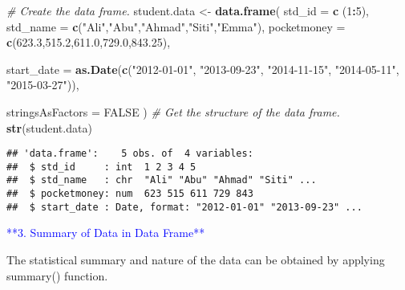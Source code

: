 \documentclass[
]{article}
\newenvironment{Shaded}{\begin{snugshade}}{\end{snugshade}}
\newcommand{\AttributeTok}[1]{\textcolor[rgb]{0.13,0.29,0.53}{#1}}
\newcommand{\CommentTok}[1]{\textcolor[rgb]{0.56,0.35,0.01}{\textit{#1}}}
\newcommand{\ConstantTok}[1]{\textcolor[rgb]{0.56,0.35,0.01}{#1}}
\newcommand{\DecValTok}[1]{\textcolor[rgb]{0.00,0.00,0.81}{#1}}
\newcommand{\FloatTok}[1]{\textcolor[rgb]{0.00,0.00,0.81}{#1}}
\newcommand{\FunctionTok}[1]{\textcolor[rgb]{0.13,0.29,0.53}{\textbf{#1}}}
\newcommand{\NormalTok}[1]{#1}
\newcommand{\OtherTok}[1]{\textcolor[rgb]{0.56,0.35,0.01}{#1}}
\newcommand{\SpecialCharTok}[1]{\textcolor[rgb]{0.81,0.36,0.00}{\textbf{#1}}}
\newcommand{\StringTok}[1]{\textcolor[rgb]{0.31,0.60,0.02}{#1}}
\begin{document}
\begin{Shaded}
\begin{Highlighting}[]
\CommentTok{\# Create the data frame.}
\NormalTok{student.data }\OtherTok{\textless{}{-}} \FunctionTok{data.frame}\NormalTok{(}
   \AttributeTok{std\_id =} \FunctionTok{c}\NormalTok{ (}\DecValTok{1}\SpecialCharTok{:}\DecValTok{5}\NormalTok{), }
   \AttributeTok{std\_name =} \FunctionTok{c}\NormalTok{(}\StringTok{"Ali"}\NormalTok{,}\StringTok{"Abu"}\NormalTok{,}\StringTok{"Ahmad"}\NormalTok{,}\StringTok{"Siti"}\NormalTok{,}\StringTok{"Emma"}\NormalTok{),}
   \AttributeTok{pocketmoney =} \FunctionTok{c}\NormalTok{(}\FloatTok{623.3}\NormalTok{,}\FloatTok{515.2}\NormalTok{,}\FloatTok{611.0}\NormalTok{,}\FloatTok{729.0}\NormalTok{,}\FloatTok{843.25}\NormalTok{), }
   
   \AttributeTok{start\_date =} \FunctionTok{as.Date}\NormalTok{(}\FunctionTok{c}\NormalTok{(}\StringTok{"2012{-}01{-}01"}\NormalTok{, }\StringTok{"2013{-}09{-}23"}\NormalTok{, }\StringTok{"2014{-}11{-}15"}\NormalTok{, }\StringTok{"2014{-}05{-}11"}\NormalTok{,}
      \StringTok{"2015{-}03{-}27"}\NormalTok{)),}

   \AttributeTok{stringsAsFactors =} \ConstantTok{FALSE}
\NormalTok{)}
\CommentTok{\# Get the structure of the data frame.}
\FunctionTok{str}\NormalTok{(student.data)}
\end{Highlighting}
\end{Shaded}

\begin{verbatim}
## 'data.frame':    5 obs. of  4 variables:
##  $ std_id     : int  1 2 3 4 5
##  $ std_name   : chr  "Ali" "Abu" "Ahmad" "Siti" ...
##  $ pocketmoney: num  623 515 611 729 843
##  $ start_date : Date, format: "2012-01-01" "2013-09-23" ...
\end{verbatim}

\textcolor{blue}{**3. Summary of Data in Data Frame**}

The statistical summary and nature of the data can be obtained by
applying summary() function.
\end{document}
